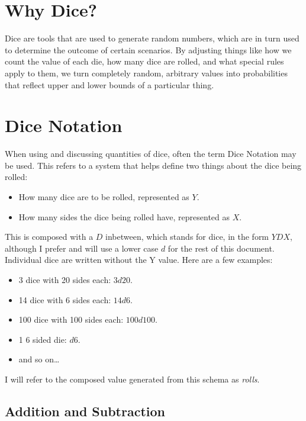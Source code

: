 \documentclass[../main.tex]{subfiles}
\begin{document}
    \setlength{\headheight}{2cm}
    \addtolength{\topmargin}{-2cm}

    \section{Why Dice?}

    Dice are tools that are used to generate random numbers, which are in turn used to determine the outcome of certain scenarios. By adjusting things like how we count the value of each die, how many dice are rolled, and what special rules apply to them, we turn completely random, arbitrary values into probabilities that reflect upper and lower bounds of a particular thing.

    \section{Dice Notation}

    When using and discussing quantities of dice, often the term Dice Notation may be used. This refers to a system that helps define two things about the dice being rolled:

    \begin{itemize}
        \item How many dice are to be rolled, represented as $Y$.
        \item How many sides the dice being rolled have, represented as $X$.
    \end{itemize}

    This is composed with a $D$ inbetween, which stands for dice, in the form $YDX$, although I prefer and will use a lower case $d$ for the rest of this document. Individual dice are written without the Y value. Here are a few examples:

    \begin{itemize}
        \item 3 dice with 20 sides each: $3d20$.
        \item 14 dice with 6 sides each: $14d6$.
        \item 100 dice with 100 sides each: $100d100$.
        \item 1 6 sided die: $d6$.
        \item and so on\dots
    \end{itemize}

    I will refer to the composed value generated from this schema as {\em rolls}.

    \subsection{Addition and Subtraction}
\end{document}
